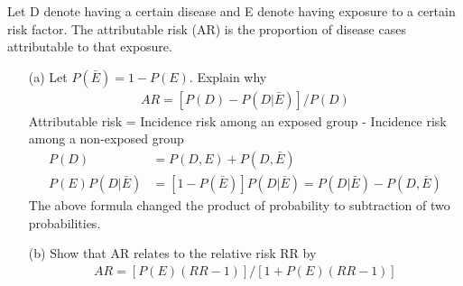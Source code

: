 \documentclass{homework}
\begin{document}
\exercise
Let D denote having a certain disease and E denote having exposure to a certain risk factor. The attributable risk (AR) is the proportion of disease cases attributable to that exposure.\\
\begin{itemize}
    \item [(a)] Let $P(\bar{E}) = 1-P(E)$. Explain why 
\begin{align*}
     AR = [P(D) - P(D|\bar{E})]/P(D)
\end{align*}
Attributable risk = Incidence risk among an exposed group - Incidence risk among a non-exposed group\\
\begin{align*}
     P(D) &= P(D, E) + P(D, \bar{E})\\
     P(E)P(D|\bar{E}) &= [1-P(\bar{E})]P(D|\bar{E}) = P(D|\bar{E}) - P(D, \bar{E})
\end{align*}
The above formula changed the product of probability to subtraction of two probabilities.\\

\item [(b)] Show that AR relates to the relative risk RR by  
    \begin{align*}
     AR = [P(E)(RR-1)]/[1+ P(E)(RR-1)]\\
\end{align*}
\end{itemize}
\end{document}
